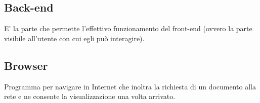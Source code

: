 \documentclass[../glossario.tex]{subfiles}
\begin{document}
\subsection*{Back-end}
E' la parte che permette l'effettivo funzionamento del front-end (ovvero la parte visibile all'utente con cui egli può interagire).

\subsection*{Browser}
Programma per navigare in Internet che inoltra la richiesta di un documento alla rete e ne consente la visualizzazione una volta arrivato.
    
\end{document}
